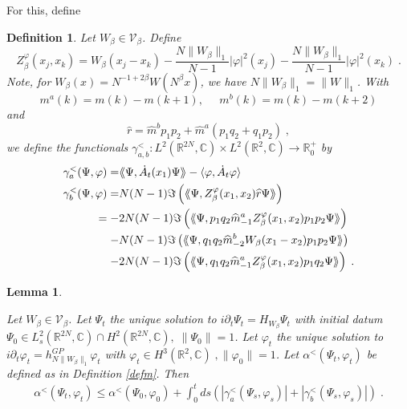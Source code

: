 \documentclass[11pt, english, american]{article}
\newcommand{\laa}{\langle\hspace{-0.08cm}\langle}
\newcommand{\raa}{\rangle\hspace{-0.08cm}\rangle}
\newcommand{\LZN}{L^2(\mathbb{R}^{2N},\mathbb{C})}
\newtheorem{lemma}[theorem]{Lemma}
\newtheorem{definition}[theorem] {Definition}
\renewcommand{\phi}{\varphi}
\newcommand{\potdiff}{Z}
\newcommand{\asaalt}{\gamma^<_a}
\newcommand{\asalt}{\gamma^<_b}
\begin{document}
For this, define
\begin{definition}\label{alphasplit}
Let $W_\beta \in \mathcal{V}_\beta$. Define
\begin{equation}\label{defz}\potdiff^\phi_\beta(x_j,x_k)=W_{\beta}(x_j-x_k)-\frac{N\|W_{\beta}\|_1}{N-1}|\phi|^2(x_j)-\frac{N\|W_{\beta}\|_1}{N-1}|\phi|^2(x_k)
\;.
\end{equation}
Note, for $W_\beta(x)= N^{-1+2 \beta} W(N^\beta x)$, we have
$N \|W_\beta\|_1= \|W\|_1$.
With
$$
    m^a(k)=m(k)-m(k+1) , \;\;\;\;\; m^b(k)=m(k)-m(k+2)
$$
and
$$\widehat{r}=\widehat{m}^bp_{1}p_{2}+\widehat{m}^a(p_{1}q_{2}+q_1p_2) \;,$$
we define the functionals $\gamma^<_{a,b}:\LZN \times L^2(\mathbb{R}^2, \mathbb{C})
\to\mathbb{R}^+_0$ by
\begin{align}\label{fnochdao} \asaalt(\Psi,\phi)%
%
=&\laa\Psi,\dot A_t(x_1)\Psi\raa-\langle\phi,\dot A_t\phi\rangle\\
%
\label{fnochda}
\asalt(\Psi,\phi)%
%
=&N(N-1)\Im\left(\laa\Psi ,\potdiff^\phi_\beta(x_1,x_2) \widehat{r}
\Psi\raa\right) 
\\
\label{asaaltsplit}
=-&2N(N-1)\Im\left(\laa\Psi ,p_{1}q_{2}\widehat{m}^a_{-1}\potdiff^\phi_\beta(x_1,x_2)p_{1}p_{2}
\Psi\raa\right)
%
\\\nonumber
-&N(N-1)\Im\left(\laa\Psi ,q_{1}q_{2}\widehat{m}^b_{-2}W_\beta(x_1-x_2) p_{1}p_{2}
\Psi\raa\right)
%
\\\nonumber
-&2N(N-1)\Im\left(\laa\Psi ,q_{1}q_{2}\widehat{m}^a_{-1}\potdiff^\phi_\beta(x_1,x_2)p_{1}q_{2}
\Psi\raa\right)\;.
\end{align}
\end{definition}
\begin{lemma}\label{ableitung}

Let $W_\beta \in \mathcal{V}_\beta$.
Let $\Psi_t$ the unique solution to $i \partial_t \Psi_t
= H_{W_\beta} \Psi_t$ with initial datum $\Psi_0 \in L^2_{s}(\mathbb{R}^{2N}, \mathbb{C}) \cap H^2(\mathbb{R}^{2N}, \mathbb{C}) ,\; 
\|\Psi_0\|=1$. 
Let $\phi_t$ the unique solution to $i \partial_t \phi_t
= h^{GP}_{N \|W_\beta\|_1} \phi_t$ with $\phi_t \in H^3(\mathbb{R}^2,\mathbb{C}) \;,\|\phi_0\|=1$.
Let $\alpha^<(\Psi_t,\phi_t)$ be defined as in Definition \ref{defm}. Then
\begin{align}
\label{lemmaableitungeq}
 \alpha^<(\Psi_t,\phi_t)\leq
  \alpha^<(\Psi_0,\phi_0)
 +
 \int_0^ t ds
 \left(
\left| \gamma_a^<(\Psi_s,\phi_s)
\right|
+
\left|
\gamma_b^<(\Psi_s,\phi_s)
\right|
\right)
\;.
\end{align}





\end{lemma}
\end{document}
